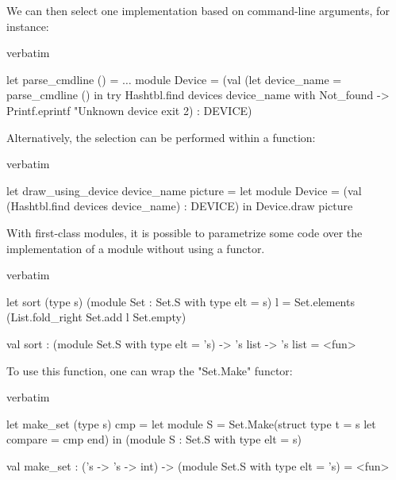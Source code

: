 We can then select one implementation based on command-line
arguments, for instance:
\begin{camlexample}{verbatim}
\begin{caml}
\begin{camlinput}
let parse_cmdline () = $\ldots$
module Device =
  (val (let device_name = parse_cmdline () in
        try Hashtbl.find devices device_name
        with Not_found ->
          Printf.eprintf "Unknown device %
          exit 2)
   : DEVICE)
\end{camlinput}
\end{caml}
\end{camlexample}
Alternatively, the selection can be performed within a function:
\begin{camlexample}{verbatim}
\begin{caml}
\begin{camlinput}
let draw_using_device device_name picture =
  let module Device =
    (val (Hashtbl.find devices device_name) : DEVICE)
  in
  Device.draw picture
\end{camlinput}
\end{caml}
\end{camlexample}

With first-class modules, it is possible to parametrize some code over the
implementation of a module without using a functor.

\begin{camlexample}{verbatim}
\begin{caml}
\begin{camlinput}
let sort (type s) (module Set : Set.S with type elt = s) l =
  Set.elements (List.fold_right Set.add l Set.empty)
\end{camlinput}
\begin{camloutput}
val sort : (module Set.S with type elt = 's) -> 's list -> 's list = <fun>
\end{camloutput}
\end{caml}
\end{camlexample}

To use this function, one can wrap the "Set.Make" functor:

\begin{camlexample}{verbatim}
\begin{caml}
\begin{camlinput}
let make_set (type s) cmp =
  let module S = Set.Make(struct
    type t = s
    let compare = cmp
  end) in
  (module S : Set.S with type elt = s)
\end{camlinput}
\begin{camloutput}
val make_set : ('s -> 's -> int) -> (module Set.S with type elt = 's) = <fun>
\end{camloutput}
\end{caml}
\end{camlexample}

